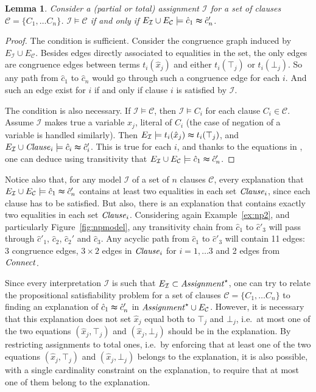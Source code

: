 \documentclass{easychair}
\newtheorem{lemma}{Lemma}
\begin{document}
\begin{lemma}
\label{lemma:eqv}
Consider a (partial or total) assignment $\mathcal{I}$ for a set of clauses
$\mathcal{C}= \{C_1, \dots C_n\}$.  $\mathcal{I} \models \mathcal{C}$ if and only if
$E_{\mathcal{I}} \cup E_\mathcal{C} \models \hat{c}_1 \thickapprox \hat{c}'_n$.
\end{lemma}
\begin{proof}
The condition is sufficient.  Consider the congruence graph induced by
$E_{\mathcal{I}} \cup E_\mathcal{C}$.  Besides edges directly associated to
equalities in the set, the only edges are congruence edges between terms
$t_i(\hat{x}_j)$ and either $t_i(\top_j)$ or $t_i(\bot_j)$.  So any path from
$\hat{c}_1$ to $\hat{c}_n$ would go through such a congruence edge for each $i$.
And such an edge exist for $i$ if and only if clause $i$ is satisfied by
$\mathcal{I}$.

The condition is also necessary.  If $\mathcal{I} \models \mathcal{C}$, then
$\mathcal{I} \models C_i$ for each clause $C_i \in \mathcal{C}$.  Assume
$\mathcal{I}$ makes true a variable $x_j$, literal of $C_i$ (the case of
negation of a variable is handled similarly).  Then $E_{\mathcal{I}} \models
t_i(\hat{x}_j) \thickapprox t_i(\top_j)$, and $E_{\mathcal{I}} \cup {\it Clause}_i
\models \hat{c}_i \thickapprox \hat{c}_i'$.  This is true for each $i$, and
thanks to the equations in \Connect, one can deduce using transitivity that
$E_{\mathcal{I}} \cup E_\mathcal{C} \models \hat{c}_1 \thickapprox \hat{c}_n'$.
\end{proof}

\noindent Notice also that, for any model $\mathcal{I}$ of a set of $n$ clauses
$\mathcal{C}$, every explanation that $E_{\mathcal{I}} \cup E_\mathcal{C}
\models \hat{c}_1 \thickapprox \hat{c}_n'$ contains at least two equalities in
each set ${\it Clause}_i$, since each clause has to be satisfied.  But also, there is
an explanation that contains exactly two equalities in each set ${\it Clause}_i$.
Considering again Example~\ref{ex:np2}, and particularly
Figure~\ref{fig:npmodel}, any transitivity chain from $\hat{c}_1$ to
$\hat{c}'_3$ will pass through $\hat{c}'_1$, $\hat{c}_2$, $\hat{c}_2'$ and
$\hat{c}_3$.  Any acyclic path from $\hat{c}_1$ to $\hat{c}'_3$ will contain 11
edges: 3 congruence edges, $3\times 2$ edges in ${\it Clause}_i$ for $i=1,\dots 3$
and 2 edges from ${\it Connect}$.

Since every interpretation $\mathcal{I}$ is such that $E_{\mathcal{I}} \subset
{\it Assignment}^\star$, one can try to relate the propositional satisfiability
problem for a set of clauses $\mathcal{C}= \{C_1, \dots C_n\}$ to finding an
explanation of $\hat{c}_1 \thickapprox \hat{c}_n'$ in ${\it Assignment}^\star \cup
E_{\mathcal{C}}$.  However, it is necessary that this explanation does not set
$\hat{x}_j$ equal both to $\top_j$ and $\bot_j$, i.e.\ at most one of the two
equations $(\hat{x}_j,\top_j)$ and $(\hat{x}_j,\bot_j)$ should be in the
explanation.  By restricting assignments to total ones, i.e.\ by enforcing that
at least one of the two equations $(\hat{x}_j,\top_j)$ and $(\hat{x}_j,\bot_j)$
belongs to the explanation, it is also possible, with a single cardinality
constraint on the explanation, to require that at most one of them belong to the
explanation.
\end{document}
